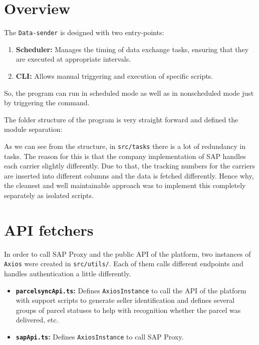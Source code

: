 \section{Overview}

The \texttt{Data-sender} is designed with two entry-points:
\begin{enumerate}
    \item \textbf{Scheduler:} Manages the timing of data exchange tasks, ensuring that they are executed at appropriate intervals.
    \item \textbf{\ac{CLI}:} Allows manual triggering and execution of specific scripts.
\end{enumerate}

So, the program can run in scheduled mode as well as in nonscheduled mode just by triggering the command. 

The folder structure of the program is very straight forward and defined the module separation:

As we can see from the structure, in \texttt{src/tasks} there is a lot of redundancy in tasks.
The reason for this is that the company implementation of SAP handles each carrier slightly differently.
Due to that, the tracking numbers for the carriers are inserted into different columns and the data is fetched differently. 
Hence why, the cleanest and well maintainable approach was to implement this completely separately as isolated scripts.

\section{API fetchers}
In order to call SAP Proxy and the public API of the platform, two instances of \texttt{Axios} were created in \texttt{src/utils/}.
Each of them calls different endpoints and handles authentication a little differently.
\begin{itemize}
    \item \textbf{\texttt{parcelsyncApi.ts}:} Defines \texttt{AxiosInstance} to call the API of the platform with support scripts to generate seller identification and defines several groups of parcel statuses to help with recognition whether the parcel was delivered, etc.
    \item \textbf{\texttt{sapApi.ts}:} Defines \texttt{AxiosInstance} to call SAP Proxy.
\end{itemize}

